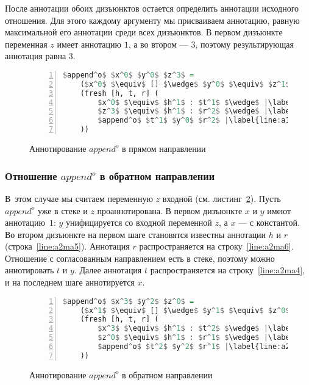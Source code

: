 \documentclass[conference,american,russian]{IEEEtran}
\begin{document}
После аннотации обоих дизъюнктов остается определить аннотации исходного отношения. 
Для этого каждому аргументу мы присваиваем аннотацию, равную максимальной его аннотации среди всех дизъюнктов.
В первом дизъюнкте переменная $z$ имеет аннотацию $1$, а во втором --- $3$, поэтому результирующая аннотация равна $3$.

\begin{figure}[h!]
  \begin{center}
  \begin{minipage}{0.31\textwidth}
  \begin{lstlisting}[language=Haskell, frame=single, numbers=left,numberstyle=\small, escapechar=|]
  $append^o$ $x^0$ $y^0$ $z^3$ =
    ($x^0$ $\equiv$ [] $\wedge$ $y^0$ $\equiv$ $z^1$) $\vee$ |\label{line:a1ma2}|
    (fresh [h, t, r] (
        $x^0$ $\equiv$ $h^1$ : $t^1$ $\wedge$ |\label{line:a1ma4}|
        $z^3$ $\equiv$ $h^1$ : $r^2$ $\wedge$ |\label{line:a1ma5}|
        $append^o$ $t^1$ $y^0$ $r^2$ |\label{line:a1ma6}|
    ))
    \end{lstlisting}
  \end{minipage}
  \end{center}
  \caption{Аннотирование $append^o$ в прямом направлении}
  \label{lst:appendoANN1}
\end{figure}

\subsubsection{Отношение $append^o$ в обратном направлении}

В~этом случае мы считаем переменную $z$ входной (см. листинг~\ref{lst:appendoANN2}).
Пусть $append^o$ уже в стеке и $z$ проаннотирована.
В первом дизъюнкте $x$ и $y$ имеют аннотацию~$1$: $y$ унифицируется со входной переменной $z$, а $x$ --- с константой.
Во втором дизъюнкте на первом шаге становятся известны аннотации $h$ и $r$ (строка~\ref{line:a2ma5}).
Аннотация $r$ распространяется на строку~\ref{line:a2ma6}. 
Отношение с согласованным направлением есть в стеке, поэтому можно аннотировать $t$ и $y$.
Далее аннотация $t$ распространяется на строку~\ref{line:a2ma4}, и на последнем шаге аннотируется $x$. 

\begin{figure}[h!]
  \begin{center}
  \begin{minipage}{0.3\textwidth}
  \begin{lstlisting}[language=Haskell, frame=single, numbers=left,numberstyle=\small, escapechar=|]
  $append^o$ $x^3$ $y^2$ $z^0$ =
    ($x^1$ $\equiv$ [] $\wedge$ $y^1$ $\equiv$ $z^0$) $\vee$ |\label{line:a2ma2}|
    (fresh [h, t, r] (
        $x^3$ $\equiv$ $h^1$ : $t^2$ $\wedge$ |\label{line:a2ma4}|
        $z^0$ $\equiv$ $h^1$ : $r^1$ $\wedge$ |\label{line:a2ma5}|
        $append^o$ $t^2$ $y^2$ $r^1$ |\label{line:a2ma6}|
    ))
    \end{lstlisting}
  \end{minipage}
  \end{center}
  \caption{Аннотирование $append^o$ в обратном направлении}
  \label{lst:appendoANN2}
\end{figure}
\end{document}
